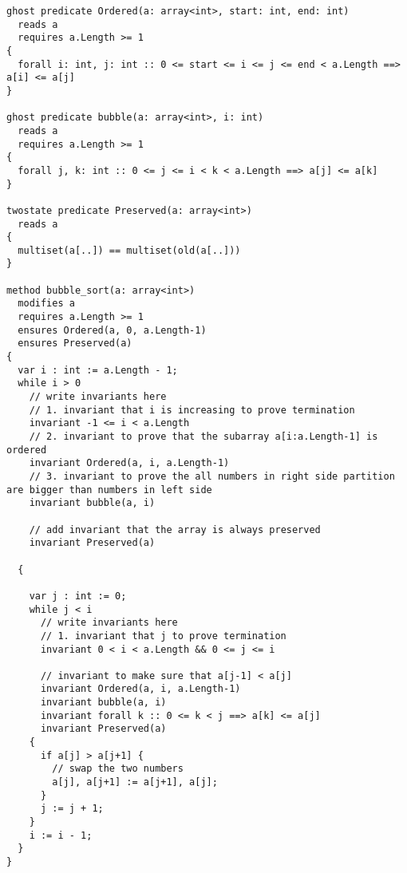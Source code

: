 \documentclass{jhwhw}
\begin{document}
\begin{lstlisting}
ghost predicate Ordered(a: array<int>, start: int, end: int)
  reads a
  requires a.Length >= 1
{
  forall i: int, j: int :: 0 <= start <= i <= j <= end < a.Length ==> a[i] <= a[j]
}

ghost predicate bubble(a: array<int>, i: int)
  reads a
  requires a.Length >= 1
{
  forall j, k: int :: 0 <= j <= i < k < a.Length ==> a[j] <= a[k]
}

twostate predicate Preserved(a: array<int>)
  reads a
{
  multiset(a[..]) == multiset(old(a[..]))
}

method bubble_sort(a: array<int>)
  modifies a
  requires a.Length >= 1
  ensures Ordered(a, 0, a.Length-1)
  ensures Preserved(a)
{
  var i : int := a.Length - 1;
  while i > 0
    // write invariants here
    // 1. invariant that i is increasing to prove termination
    invariant -1 <= i < a.Length
    // 2. invariant to prove that the subarray a[i:a.Length-1] is ordered
    invariant Ordered(a, i, a.Length-1)
    // 3. invariant to prove the all numbers in right side partition are bigger than numbers in left side
    invariant bubble(a, i)

    // add invariant that the array is always preserved
    invariant Preserved(a)

  {

    var j : int := 0;
    while j < i
      // write invariants here
      // 1. invariant that j to prove termination
      invariant 0 < i < a.Length && 0 <= j <= i

      // invariant to make sure that a[j-1] < a[j]
      invariant Ordered(a, i, a.Length-1)
      invariant bubble(a, i)
      invariant forall k :: 0 <= k < j ==> a[k] <= a[j]
      invariant Preserved(a)
    {
      if a[j] > a[j+1] {
        // swap the two numbers
        a[j], a[j+1] := a[j+1], a[j];
      }
      j := j + 1;
    }
    i := i - 1;
  }
}
\end{lstlisting}
\end{document}
